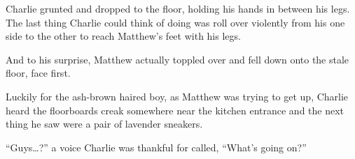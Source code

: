 Charlie grunted and dropped to the floor, holding his hands in between his legs. The last thing Charlie could think of doing was roll over violently from his one side to the other to reach Matthew's feet with his legs.

And to his surprise, Matthew actually toppled over and fell down onto the stale floor, face first.

Luckily for the ash-brown haired boy, as Matthew was trying to get up, Charlie heard the floorboards creak somewhere near the kitchen entrance and the next thing he saw were a pair of lavender sneakers.

“Guys…?” a voice Charlie was thankful for called, “What's going on?”